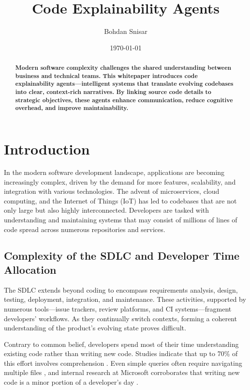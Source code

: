 \documentclass[12pt,twocolumn]{article}
\date{\small\today}
\title{%
  Code Explainability Agents \\
  \colorbox{mypink}{\small\sffamily\color{white}{White Paper}}}
\author{Bohdan Snisar}
\begin{document}
\raggedbottom
\maketitle

\begin{abstract}
  \textbf{Modern software complexity challenges the shared understanding between business and technical teams. 
  This whitepaper introduces code explainability agents—intelligent systems that translate evolving codebases 
  into clear, context-rich narratives. By linking source code details to strategic objectives, these agents 
  enhance communication, reduce cognitive overhead, and improve maintainability.}
  \end{abstract}


\section{Introduction}

In the modern software development landscape, applications are becoming increasingly complex, driven by the demand
for more features, scalability, and integration with various technologies. The advent of microservices, cloud computing, 
and the Internet of Things (IoT) has led to codebases that are not only large but also highly interconnected. Developers are 
tasked with understanding and maintaining systems that may consist of millions of lines of code spread across numerous repositories 
and services.

\subsection{Complexity of the SDLC and Developer Time Allocation}

The SDLC extends beyond coding to encompass requirements analysis, design, testing, deployment, integration, and maintenance. 
These activities, supported by numerous tools—issue trackers, review platforms, and CI systems—fragment developers’ workflows. 
As they continually switch contexts, forming a coherent understanding of the product’s evolving state proves difficult.

Contrary to common belief, developers spend most of their time understanding existing code rather than writing new code. 
Studies indicate that up to 70\% of this effort involves comprehension \textcite{ko2006exploratory}. Even simple queries often 
require navigating multiple files \textcite{Schroer_2024}, and internal research at Microsoft corroborates that writing new code 
is a minor portion of a developer’s day \textcite{meyer2021today}.
\end{document}
